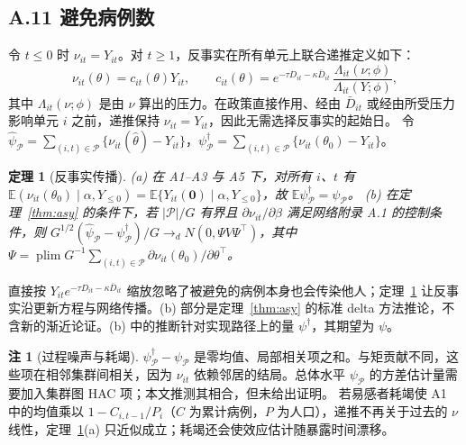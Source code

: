 \documentclass[11pt,a4paper]{ctexart}
\newtheorem{theorem}{定理}
\theoremstyle{definition}
\newtheorem{remark}{注}
\newcommand{\E}{\mathbb{E}}
\DeclareMathOperator*{\plim}{plim}
\begin{document}
\subsection*{A.11 避免病例数}

令 $t\le 0$ 时 $\nu_{it}=Y_{it}$。对 $t\ge 1$，反事实在所有单元上联合递推定义如下：
\begin{equation}
\nu_{it}(\theta)=c_{it}(\theta)Y_{it},\qquad
c_{it}(\theta)=e^{-\tau D_{it}-\kappa\bar D_{it}}\,\frac{\Lambda_{it}(\nu;\phi)}{\Lambda_{it}(Y;\phi)},
\label{eq:nu}
\end{equation}
其中 $\Lambda_{it}(\nu;\phi)$ 是由 $\nu$ 算出的压力。在政策直接作用、经由 $\bar D_{it}$ 或经由所受压力影响单元 $i$ 之前，递推保持 $\nu_{it}=Y_{it}$，因此无需选择反事实的起始日。
令 $\hat\psi_{\mathcal P}=\sum_{(i,t)\in\mathcal P}\{\nu_{it}(\hat\theta)-Y_{it}\}$，$\psi^\dagger_{\mathcal P}=\sum_{(i,t)\in\mathcal P}\{\nu_{it}(\theta_0)-Y_{it}\}$。

\begin{theorem}[反事实传播]
\label{thm:psi}
(a) 在 A1--A3 与 A5 下，对所有 $i$、$t$ 有 $\E(\nu_{it}(\theta_0)\mid\alpha,Y_{\le 0})=\E\{Y_{it}(\mathbf 0)\mid\alpha,Y_{\le 0}\}$，故 $\E\psi^\dagger_{\mathcal P}=\psi_{\mathcal P}$。
(b) 在定理~\ref{thm:asy} 的条件下，若 $|\mathcal P|/G$ 有界且 $\partial\nu_{it}/\partial\beta$ 满足网络附录 A.1 的控制条件，则 $G^{1/2}(\hat\psi_{\mathcal P}-\psi^\dagger_{\mathcal P})/G\to_d N(0,\Psi V\Psi^{\top})$，其中 $\Psi=\plim G^{-1}\sum_{(i,t)\in\mathcal P}\partial\nu_{it}(\theta_0)/\partial\theta^{\top}$。
\end{theorem}

直接按 $Y_{it}e^{-\tau D_{it}-\kappa\bar D_{it}}$ 缩放忽略了被避免的病例本身也会传染他人；定理~\ref{thm:psi} 让反事实沿更新方程与网络传播。(b) 部分是定理~\ref{thm:asy} 的标准 delta 方法推论，不含新的渐近论证。(b) 中的推断针对实现路径上的量 $\psi^\dagger$，其期望为 $\psi$。

\begin{remark}[过程噪声与耗竭]
\label{rem:psi}
$\psi^\dagger_{\mathcal P}-\psi_{\mathcal P}$ 是零均值、局部相关项之和。与矩贡献不同，这些项在相邻集群间相关，因为 $\nu_{it}$ 依赖邻居的结局。总体水平 $\psi_{\mathcal P}$ 的方差估计量需要加入集群图 HAC 项；本文推测其相合，但未给出证明。
若易感者耗竭使 A1 中的均值乘以 $1-C_{i,t-1}/P_i$（$C$ 为累计病例，$P$ 为人口），递推不再关于过去的 $\nu$ 线性，定理~\ref{thm:psi}(a) 只近似成立；耗竭还会使效应估计随暴露时间漂移\citep{janvin2025depletion}。
\end{remark}
\end{document}
